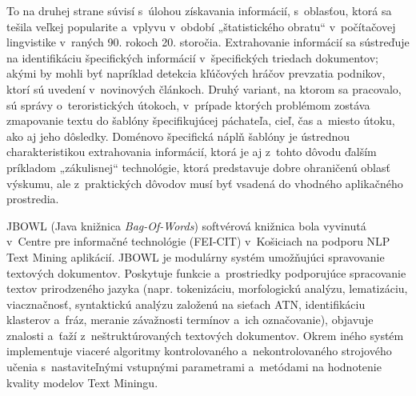 \begin{multicols}{2}
To na druhej strane súvisí s~úlohou získavania informácií, s~oblasťou, ktorá sa tešila veľkej popularite a~vplyvu v~období „štatistického obratu“ v~počítačovej lingvistike v~raných 90. rokoch 20. storočia. Extrahovanie informácií sa sústreďuje na identifikáciu špecifických informácií v~špecifických triedach dokumentov; akými by mohli byť napríklad detekcia kľúčových hráčov prevzatia podnikov, ktorí sú uvedení v~novinových článkoch. Druhý variant, na ktorom sa pracovalo, sú správy o~teroristických útokoch, v~prípade ktorých problémom zostáva zmapovanie textu do šablóny špecifikujúcej páchateľa, cieľ, čas a~miesto útoku, ako aj jeho dôsledky. Doménovo špecifická náplň šablóny je ústrednou charakteristikou extrahovania informácií, ktorá je aj z~tohto dôvodu ďalším príkladom „zákulisnej“ technológie, ktorá predstavuje dobre ohraničenú oblasť výskumu, ale z~praktických dôvodov musí byť vsadená do vhodného aplikačného prostredia. 


JBOWL (Java knižnica \emph{Bag-Of-Words}) softvérová knižnica bola vyvinutá v~Centre pre informačné technológie (FEI-CIT) v~Košiciach na podporu NLP Text Mining aplikácií. JBOWL je modulárny systém umožňujúci spravovanie textových dokumentov. Poskytuje funkcie a~prostriedky podporujúce spracovanie textov prirodzeného jazyka (napr. tokenizáciu, morfologickú analýzu, lematizáciu, viacznačnosť, syntaktickú analýzu založenú na sieťach ATN, identifikáciu klasterov a~fráz, meranie závažnosti termínov a~ich označovanie), objavuje znalosti a~ťaží z~neštruktúrovaných textových dokumentov. Okrem iného systém implementuje viaceré algoritmy kontrolovaného a~nekontrolovaného strojového učenia s~nastaviteľnými vstupnými parametrami a~metódami na hodnotenie kvality modelov Text Miningu.



\end{multicols}
